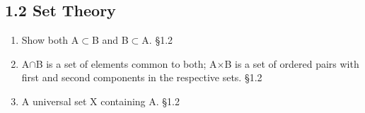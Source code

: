 \documentclass[11pt]{article}
\begin{document}
\begin{keepsection}\subsection{1.2 Set Theory}

\begin{enumerate}
\item Show both A\ensuremath{\subset}B and B\ensuremath{\subset}A. \hfill{\small\color{FAUblue}§1.2}
\item A\ensuremath{\cap}B is a set of elements common to both; A\ensuremath{\times}B is a set of ordered pairs with first and second components in the respective sets. \hfill{\small\color{FAUblue}§1.2}
\item A universal set X containing A. \hfill{\small\color{FAUblue}§1.2}
\end{enumerate}

\end{keepsection}
\end{document}
